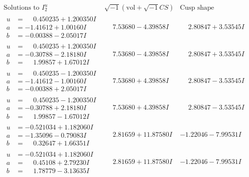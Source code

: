 \documentclass[1p]{elsarticle_modified}
\theoremstyle{definition}
\newcommand{\I}{\sqrt{-1}}
\begin{document}
$$\begin{array}{c|c|c}
\text{Solutions to }I^u_{2}& \I (\text{vol} + \sqrt{-1}CS) & \text{Cusp shape}\\
 \hline 
\begin{aligned}
u &= \phantom{-}0.450235 + 1.200350 I \\
a &= -1.41612 + 1.00160 I \\
b &= -0.00388 - 2.05017 I\end{aligned}
 & \phantom{-}7.53680 - 4.39858 I & \phantom{-}2.80847 + 3.53545 I \\ \hline\begin{aligned}
u &= \phantom{-}0.450235 + 1.200350 I \\
a &= -0.30788 - 2.18180 I \\
b &= \phantom{-}1.99857 + 1.67012 I\end{aligned}
 & \phantom{-}7.53680 - 4.39858 I & \phantom{-}2.80847 + 3.53545 I \\ \hline\begin{aligned}
u &= \phantom{-}0.450235 - 1.200350 I \\
a &= -1.41612 - 1.00160 I \\
b &= -0.00388 + 2.05017 I\end{aligned}
 & \phantom{-}7.53680 + 4.39858 I & \phantom{-}2.80847 - 3.53545 I \\ \hline\begin{aligned}
u &= \phantom{-}0.450235 - 1.200350 I \\
a &= -0.30788 + 2.18180 I \\
b &= \phantom{-}1.99857 - 1.67012 I\end{aligned}
 & \phantom{-}7.53680 + 4.39858 I & \phantom{-}2.80847 - 3.53545 I \\ \hline\begin{aligned}
u &= -0.521034 + 1.182060 I \\
a &= -1.35096 - 0.79083 I \\
b &= \phantom{-}0.32647 + 1.66351 I\end{aligned}
 & \phantom{-}2.81659 + 11.87580 I & -1.22046 - 7.99531 I \\ \hline\begin{aligned}
u &= -0.521034 + 1.182060 I \\
a &= \phantom{-}0.45108 + 2.79230 I \\
b &= \phantom{-}1.78779 - 3.13635 I\end{aligned}
 & \phantom{-}2.81659 + 11.87580 I & -1.22046 - 7.99531 I \\ \hline\begin{aligned}

\end{aligned}
\end{array}$$
\end{document}
